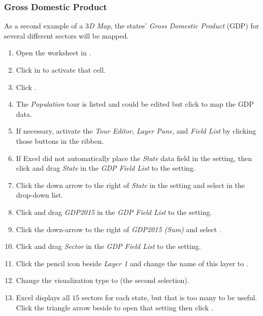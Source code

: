 \subsubsection{Gross Domestic Product}

As a second example of a \textit{$ 3 $D Map}, the states' \textit{Gross Domestic Product} (GDP) for several different sectors will be mapped.

\begin{enumbox}
	\begin{enumerate}
		\item Open the  worksheet in .
		\item Click in  to activate that cell.
		\item Click .
		\item The \textit{Population} tour is listed and could be edited but click  to map the GDP data.
		\item If necessary, activate the \textit{Tour Editor}, \textit{Layer Pane}, and \textit{Field List} by clicking those buttons in the ribbon.
		\item If Excel did not automatically place the \textit{State} data field in the  setting, then click and drag \textit{State} in the \textit{GDP Field List} to the  setting. 
		\item Click the down arrow to the right of \textit{State} in the  setting and select  in the drop-down list.
		\item Click and drag \textit{GDP2015} in the \textit{GDP Field List} to the  setting.
		\item Click the down-arrow to the right of \textit{GDP2015 (Sum)} and select .
		\item Click and drag \textit{Sector} in the \textit{GDP Field List} to the  setting.
		\item Click the pencil icon beside \textit{Layer 1} and change the name of this layer to .
		\item Change the visualization type to  (the second selection).
		\item Excel displays all $ 15 $ sectors for each state, but that is too many to be useful. Click the triangle arrow beside  to open that setting then click .

\end{enumerate}
\end{enumbox}

